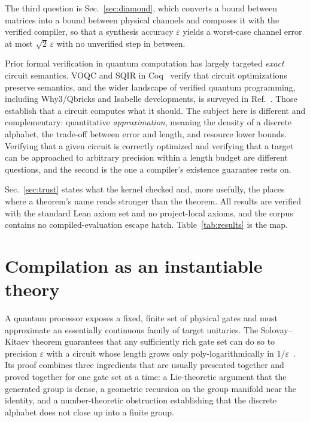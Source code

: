 \documentclass[aps,pra,reprint,nofootinbib,superscriptaddress]{revtex4-2}
\theoremstyle{plain}
\theoremstyle{definition}
\begin{document}
The third question is Sec.~\ref{sec:diamond}, which converts a bound between
matrices into a bound between physical channels and composes it with the
verified compiler, so that a synthesis accuracy $\varepsilon$ yields a
worst-case channel error at most $\sqrt 2\,\varepsilon$ with no unverified step
in between.

Prior formal verification in quantum computation has largely targeted
\emph{exact} circuit semantics. VOQC and SQIR in Coq~\cite{Hietala2020VOQC}
verify that circuit optimizations preserve semantics, and the wider landscape
of verified quantum programming, including Why3/Qbricks and Isabelle
developments, is surveyed in Ref.~\cite{Lewis2021VerifQC}. Those establish that
a circuit computes what it should. The subject here is different and
complementary: quantitative \emph{approximation}, meaning the density of a
discrete alphabet, the trade-off between error and length, and resource lower
bounds. Verifying that a given circuit is correctly optimized and verifying
that a target can be approached to arbitrary precision within a length budget
are different questions, and the second is the one a compiler's existence
guarantee rests on.

Sec.~\ref{sec:trust} states what the kernel checked and, more usefully, the
places where a theorem's name reads stronger than the theorem. All results are
verified with the standard Lean axiom set and no project-local axioms, and the
corpus contains no compiled-evaluation escape hatch.
Table~\ref{tab:results} is the map.

\begin{table}
\caption{The results, and where each is proved. Conditional statements carry
their hypotheses in the theorem statement; unconditional ones have none.}
\label{tab:results}
\begin{ruledtabular}

\end{ruledtabular}
\end{table}

\section{Compilation as an instantiable theory}
\label{sec:substrate}

A quantum processor exposes a fixed, finite set of physical gates and must
approximate an essentially continuous family of target unitaries. The
Solovay--Kitaev theorem guarantees that any sufficiently rich gate set can do
so to precision $\varepsilon$ with a circuit whose length grows only
poly-logarithmically in $1/\varepsilon$~\cite{KitaevShenVyalyi2002,DawsonNielsen2006,AharonovArad2011}.
Its proof combines three ingredients that are usually presented together and
proved together for one gate set at a time: a Lie-theoretic argument that the
generated group is dense, a geometric recursion on the group manifold near the
identity, and a number-theoretic obstruction establishing that the discrete
alphabet does not close up into a finite group.
\end{document}
